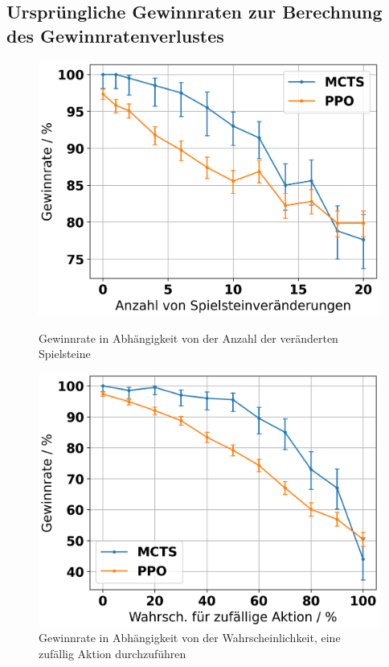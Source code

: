 \subsection{Ursprüngliche Gewinnraten zur Berechnung des Gewinnratenverlustes}

\label{appendix-original-win-rates}

\begin{figure}[H]
	\begin{minipage}[c]{0.48\linewidth}
		\includegraphics[width=\linewidth]{Bilder/robustness-results/uncertain_observations_win_rates.png}
		\caption{Gewinnrate in Abhängigkeit von der Anzahl der veränderten Spielsteine}
	\end{minipage}
	\hfill
	\begin{minipage}[c]{0.48\linewidth}
		\includegraphics[width=\linewidth]{Bilder/robustness-results/uncertain_actions_win_rates.png}
		\caption{Gewinnrate in Abhängigkeit von der Wahrscheinlichkeit, eine zufällig Aktion durchzuführen}
	\end{minipage}
\end{figure}
